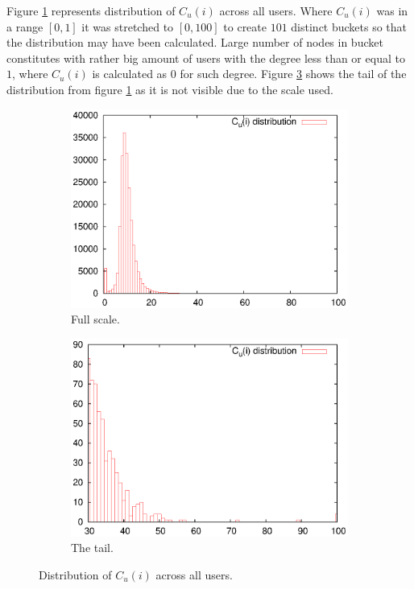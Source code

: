       Figure \ref{fig:cs_dist_full} represents distribution of $C_u(i)$ across all users. Where $C_u(i)$ was in a range $[0, 1]$ it was stretched to $[0, 100]$ to create $101$ distinct buckets so that the distribution may have been calculated. Large number of nodes in  bucket constitutes with rather big amount of users with the degree less than or equal to $1$, where $C_u(i)$ is calculated as $0$ for such degree. Figure \ref{fig:cs_dist_tail} shows the tail of the distribution from figure \ref{fig:cs_dist_full} as it is not visible due to the scale used.
      \begin{figure}[H]
        \centering
        \begin{subfigure}[b]{0.49\textwidth}
          \centering
          \includegraphics[width=\textwidth]{chapters/03_implementation/cs_dist}
          \caption{Full scale.}
          \label{fig:cs_dist_full}
        \end{subfigure}
        \begin{subfigure}[b]{0.49\textwidth}
          \centering
          \includegraphics[width=\textwidth]{chapters/03_implementation/cs_dist_tail}
          \caption{The tail.}
          \label{fig:cs_dist_tail}
        \end{subfigure}
        \caption{Distribution of $C_u(i)$ across all users.}
      \end{figure}
      
